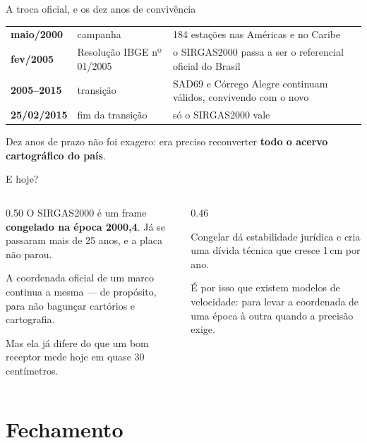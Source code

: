 \documentclass[aspectratio=169,11pt]{beamer}
\newcommand{\bnum}[1]{\textbf{\textcolor{mTeal}{#1}}}
\begin{document}
\begin{frame}{A troca oficial, e os dez anos de convivência}
  \centering
  \small
  \renewcommand{\arraystretch}{1.4}
  \begin{tabular}{llp{6.4cm}}
    \toprule
    \textbf{maio/2000} & campanha & 184 estações nas Américas e no Caribe \\
    \textbf{fev/2005} & Resolução IBGE nº 01/2005 & o SIRGAS2000 passa a ser o referencial
      oficial do Brasil \\
    \textbf{2005--2015} & transição & SAD69 e Córrego Alegre continuam válidos, convivendo
      com o novo \\
    \textbf{25/02/2015} & fim da transição & só o SIRGAS2000 vale \\
    \bottomrule
  \end{tabular}
  \bigskip

  Dez anos de prazo não foi exagero: era preciso reconverter \bnum{todo o acervo
  cartográfico do país}.
\end{frame}

\begin{frame}{E hoje?}
  \begin{columns}[T]
    \begin{column}{0.50\textwidth}
      O SIRGAS2000 é um frame \bnum{congelado na época 2000,4}. Já se passaram mais de 25
      anos, e a placa não parou.
      \medskip

      A coordenada oficial de um marco continua a mesma --- de propósito, para não
      bagunçar cartórios e cartografia.
      \medskip

      Mas ela já difere do que um bom receptor mede hoje em quase \alert{30 centímetros}.
    \end{column}
    \begin{column}{0.46\textwidth}
      \begin{ideia}[title={O mesmo dilema da Austrália}]
        Congelar dá estabilidade jurídica e cria uma dívida técnica que cresce 1\,cm por ano.
        \medskip

        É por isso que existem modelos de velocidade: para levar a coordenada de uma época
        à outra quando a precisão exige.
      \end{ideia}
    \end{column}
  \end{columns}
\end{frame}

\section{Fechamento}
\end{document}
